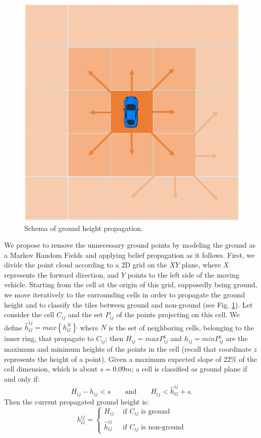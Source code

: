 \begin{figure}[t]
\centering
\includegraphics[width=0.4\columnwidth]{./img/ch-laser/groundpropagation}
\caption{Schema of ground height propagation.}
\label{fig:propag}
\end{figure}

We propose to remove the unnecessary ground points by modeling the ground as a Markov Random Fields and applying belief propagation as it follows. 
First, we divide the point cloud according to a 2D grid on the $XY$ plane, where $X$ represents the forward direction, and $Y$ points to the left side of the moving vehicle. 
Starting from the cell at the origin of this grid, supposedly being ground, we move iteratively to the surrounding cells in order to propagate the ground height and to classify the tiles between ground and non-ground (see Fig. \ref{fig:propag}).
Let consider the cell $C_{ij}$ and the set $P_{ij}$ of the points projecting on this cell. We define $\hat{h}_G^{ij} = max\left\{h_G^N\right\}$ where $N$ is the set of neighboring cells, belonging to the inner ring, that propagate to  $C_{ij}$; then $H_{ij} = max{P_{ij}^z}$ and $h_{ij} = min{P_{ij}^z}$ are the maximum and minimum heights of the points in the cell (recall that coordinate $z$ represents the height of a point). 
Given a maximum expected slope of $22\%$ of the cell dimension, which is about $s=0.09m$; a cell is classified as ground plane if and only if:
\begin{equation}
H_{ij} - h_{ij} < s \qquad \text{and} \qquad H_{ij} < \hat{h}_G^{ij} + s.
\end{equation}
Then the current propagated ground height is:
\begin{equation}
   h_G^{ij} =  
      \begin{cases}
               H_{ij} \ \ & \text{if ${C}_{ij}$ is ground}\\
               \hat{h}_G^{ij} \ \ & \text{if ${C}_{ij}$ is non-ground}
        \end{cases}
\end{equation}

